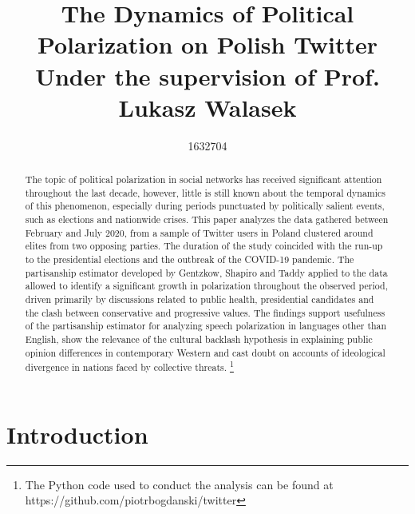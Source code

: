 \documentclass{article}
\author{1632704}
\title{%
	The Dynamics of Political Polarization on Polish Twitter \\
	\large Under the supervision of Prof. Lukasz Walasek}
\begin{document}
	
	\maketitle
	
	
	\begin{abstract}
		
	The topic of political polarization in social networks has received significant attention throughout the last decade, however, little is still known about the temporal dynamics of this phenomenon, especially during periods punctuated by politically salient events, such as elections and nationwide crises. This paper analyzes the data gathered between February and July 2020, from a sample of Twitter users in Poland clustered around elites from two opposing parties. The duration of the study coincided with the run-up to the presidential elections and the outbreak of the COVID-19 pandemic. The partisanship estimator developed by Gentzkow, Shapiro and Taddy applied to the data allowed to identify a significant growth in polarization throughout the observed period, driven primarily by discussions related to public health, presidential candidates and the clash between conservative and progressive values. The findings support usefulness of the partisanship estimator for analyzing speech polarization in languages other than English, show the relevance of the cultural backlash hypothesis in explaining public opinion differences in contemporary Western and cast doubt on accounts of ideological divergence in nations faced by collective threats. \footnote{The Python code used to conduct the analysis can be found at https://github.com/piotrbogdanski/twitter}
	
	
	\end{abstract}

	\section*{Introduction}
		
\end{document}
